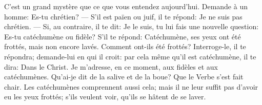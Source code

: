 C’est un grand mystère que ce que vous entendez aujourd’hui.
Demande à un homme: Es-tu chrétien?
--- S’il est païen ou juif, il te répond: Je ne suis pas chrétien.
--- Si, au contraire, il te dit: Je le suis,
	tu lui fais une nouvelle question:
	Es-tu catéchumène ou fidèle?
S’il te répond: Catéchumène, ses yeux ont été frottés, mais non encore lavés.
Comment ont-ils été frottés?
Interroge-le, il te répondra;
	demande-lui en qui il croit:
	par cela même qu’il est catéchumène, il te dira: Dans le Christ.
Je m’adresse, en ce moment, aux fidèles et aux catéchumènes.
Qu’ai-je dit de la salive et de la boue?
	Que le Verbe s’est fait chair.
Les catéchumènes comprennent aussi cela;
	mais il ne leur suffit pas d’avoir eu les yeux frottés;
	s’ils veulent voir, qu’ils se hâtent de se laver.
